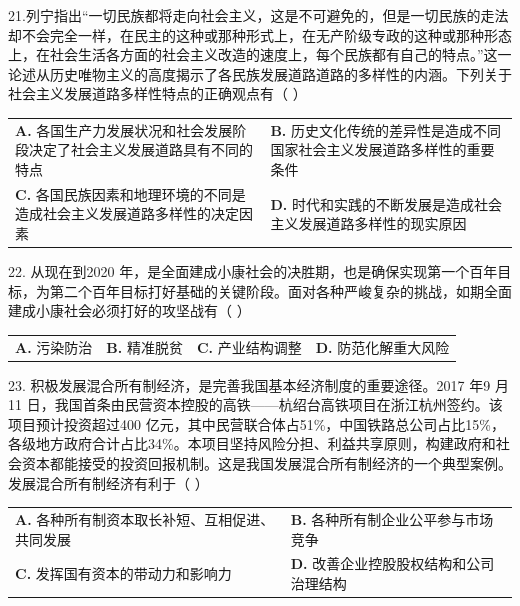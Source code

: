 \documentclass[UTF8,11pt]{ctexart}
\begin{document}
21.列宁指出“一切民族都将走向社会主义，这是不可避免的，但是一切民族的走法却不会完全一样，在民主的这种或那种形式上，在无产阶级专政的这种或那种形态上，在社会生活各方面的社会主义改造的速度上，每个民族都有自己的特点。”这一论述从历史唯物主义的高度揭示了各民族发展道路道路的多样性的内涵。下列关于社会主义发展道路多样性特点的正确观点有（      ）


\begin{center}\begin{tabular}{>{\raggedright\arraybackslash}p{\dimexpr(\linewidth-4\tabcolsep)/2\relax}>{\raggedright\arraybackslash}p{\dimexpr(\linewidth-4\tabcolsep)/2\relax}}
\textbf{A.} 各国生产力发展状况和社会发展阶段决定了社会主义发展道路具有不同的特点 & \textbf{B.} 历史文化传统的差异性是造成不同国家社会主义发展道路多样性的重要条件\\[.35em]
\textbf{C.} 各国民族因素和地理环境的不同是造成社会主义发展道路多样性的决定因素 & \textbf{D.} 时代和实践的不断发展是造成社会主义发展道路多样性的现实原因\\[.35em]\end{tabular}\end{center}

22. 从现在到2020 年，是全面建成小康社会的决胜期，也是确保实现第一个百年目标，为第二个百年目标打好基础的关键阶段。面对各种严峻复杂的挑战，如期全面建成小康社会必须打好的攻坚战有（      ）


\begin{center}\begin{tabular}{>{\raggedright\arraybackslash}p{\dimexpr(\linewidth-8\tabcolsep)/4\relax}>{\raggedright\arraybackslash}p{\dimexpr(\linewidth-8\tabcolsep)/4\relax}>{\raggedright\arraybackslash}p{\dimexpr(\linewidth-8\tabcolsep)/4\relax}>{\raggedright\arraybackslash}p{\dimexpr(\linewidth-8\tabcolsep)/4\relax}}
\textbf{A.} 污染防治 & \textbf{B.} 精准脱贫 & \textbf{C.} 产业结构调整 & \textbf{D.} 防范化解重大风险\\[.35em]\end{tabular}\end{center}

23. 积极发展混合所有制经济，是完善我国基本经济制度的重要途径。2017 年9 月11 日，我国首条由民营资本控股的高铁——杭绍台高铁项目在浙江杭州签约。该项目预计投资超过400 亿元，其中民营联合体占51\%，中国铁路总公司占比15\%，各级地方政府合计占比34\%。本项目坚持风险分担、利益共享原则，构建政府和社会资本都能接受的投资回报机制。这是我国发展混合所有制经济的一个典型案例。发展混合所有制经济有利于（      ）


\begin{center}\begin{tabular}{>{\raggedright\arraybackslash}p{\dimexpr(\linewidth-4\tabcolsep)/2\relax}>{\raggedright\arraybackslash}p{\dimexpr(\linewidth-4\tabcolsep)/2\relax}}
\textbf{A.} 各种所有制资本取长补短、互相促进、共同发展 & \textbf{B.} 各种所有制企业公平参与市场竞争\\[.35em]
\textbf{C.} 发挥国有资本的带动力和影响力 & \textbf{D.} 改善企业控股股权结构和公司治理结构\\[.35em]\end{tabular}\end{center}
\end{document}
